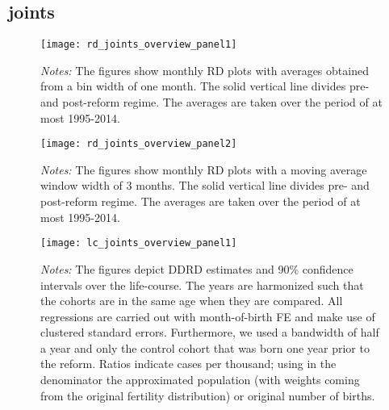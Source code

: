 \subsection{joints}
\begin{landscape}
\begin{figure}[H]
	\centering
	\begin{minipage}{.95\linewidth}
	\texttt{[image: rd\_joints\_overview\_panel1]}
	{\scriptsize \emph{Notes:} The figures show monthly RD plots with averages obtained from a bin width of one month. The solid vertical line divides pre- and post-reform regime. The averages are taken over the period of at most 1995-2014. \par}
\end{minipage}
\end{figure}
\end{landscape}
\begin{landscape}
\begin{figure}[H]
	\centering
\begin{minipage}{.95\linewidth}
	\texttt{[image: rd\_joints\_overview\_panel2]}
	{\scriptsize \emph{Notes:} The figures show monthly RD plots with a moving average window width of 3 months. The solid vertical line divides pre- and post-reform regime. The averages are taken over the period of at most 1995-2014. \par}
\end{minipage}
\end{figure}
\end{landscape}


\begin{landscape}
\begin{figure}[H]
\centering
\begin{minipage}{.9\linewidth}
\texttt{[image: lc\_joints\_overview\_panel1]}
{\scriptsize \emph{Notes:} The figures depict DDRD estimates and 90\% confidence intervals over the life-course. The years are harmonized such that the cohorts are in the same age when they are compared. All regressions are carried out with month-of-birth FE and make use of clustered standard errors. Furthermore, we used a bandwidth of half a year and only the control cohort that was born one year prior to the reform. Ratios indicate cases per thousand; using in the denominator the approximated population (with weights coming from the original fertility distribution) or original number of births. \par}
\end{minipage}
\end{figure}
\end{landscape}
